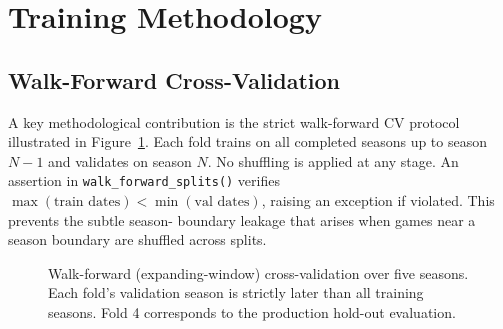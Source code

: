 \documentclass[conference]{IEEEtran}
\begin{document}
\section{Training Methodology}
\label{sec:training}

\subsection{Walk-Forward Cross-Validation}
\label{subsec:wfcv}

A key methodological contribution is the strict walk-forward CV
protocol illustrated in Figure~\ref{fig:wfcv}.  Each fold trains on
all completed seasons up to season $N-1$ and validates on season $N$.
No shuffling is applied at any stage.  An assertion in
\texttt{walk\_forward\_splits()} verifies
$\max(\text{train dates}) < \min(\text{val dates})$,
raising an exception if violated.  This prevents the subtle season-
boundary leakage that arises when games near a season boundary are
shuffled across splits.

\begin{figure}[t]
\centering
{}
\caption{Walk-forward (expanding-window) cross-validation over five
seasons.  Each fold's validation season is strictly later than all
training seasons.  Fold 4 corresponds to the production hold-out
evaluation.}
\label{fig:wfcv}
\end{figure}
\end{document}
